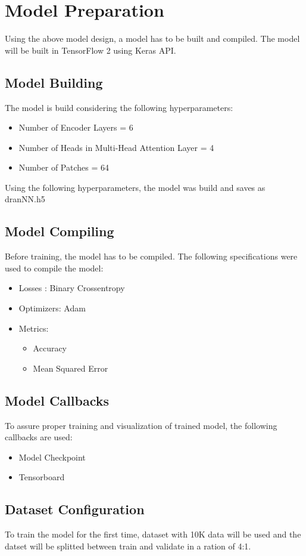 \section{Model Preparation}
Using the above model design, a model has to be built and compiled. The model will be built in TensorFlow 2 using Keras API.

\subsection{Model Building}
The model is build considering the following hyperparameters:
\begin{itemize}
    \item Number of Encoder Layers = 6
    \item Number of Heads in Multi-Head Attention Layer = 4
    \item Number of Patches = 64
\end{itemize}
Using the following hyperparameters, the model was build and saves as dranNN.h5

\subsection{Model Compiling}
Before training, the model has to be compiled. The following specifications were used to compile the model:
\begin{itemize}
    \item Losses :  Binary Crossentropy
    \item Optimizers: Adam
    \item Metrics:
    \begin{itemize}
        \item Accuracy
        \item Mean Squared Error
      \end{itemize}
\end{itemize}

\subsection{Model Callbacks}
To assure proper training and visualization of trained model, the following callbacks are used:
\begin{itemize}
    \item Model Checkpoint
    \item Tensorboard
\end{itemize}

\subsection{Dataset Configuration}
To train the model for the first time, dataset with 10K data will be used and the datset will be splitted between train and validate in a ration of 4:1.